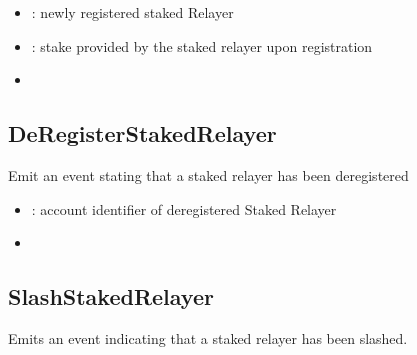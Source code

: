 \documentclass[a4paper,10pt,english]{sphinxmanual}
\begin{document}


\begin{itemize}
\item {} 
: newly registered staked Relayer

\item {} 
: stake provided by the staked relayer upon registration

\end{itemize}

\begin{itemize}
\item {} 
{\hyperref[\detokenize{spec/staked-relayers:registerstakedrelayer}]{}}

\end{itemize}


\subsection{DeRegisterStakedRelayer}
\label{\detokenize{spec/staked-relayers:id14}}
Emit an event stating that a staked relayer has been de\sphinxhyphen{}registered



\begin{itemize}
\item {} 
: account identifier of de\sphinxhyphen{}registered Staked Relayer

\end{itemize}

\begin{itemize}
\item {} 
{\hyperref[\detokenize{spec/staked-relayers:deregisterstakedrelayer}]{}}

\end{itemize}


\subsection{SlashStakedRelayer}
\label{\detokenize{spec/staked-relayers:id15}}
Emits an event indicating that a staked relayer has been slashed.
\end{document}
